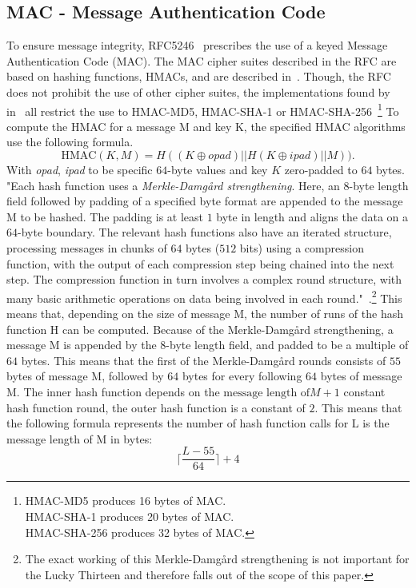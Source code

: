 \documentclass[10pt,conference,a4paper]{IEEEtran}
\begin{document}
\subsection{MAC - Message Authentication Code}
\label{sec:crypto:hmac}
To ensure message integrity, RFC5246~\cite{ietf2008transport} prescribes the use of a keyed Message Authentication Code (MAC). The MAC cipher suites described in the RFC are based on hashing functions, HMACs, and are described in~\cite{krawczyk1997rfc}. Though, the RFC does not prohibit the use of other cipher suites, the implementations found by~\citeauthor{alfardan2013lucky} in~\cite{alfardan2013lucky} all restrict the use to HMAC-MD5, HMAC-SHA-1 or HMAC-SHA-256~\footnote{HMAC-MD5 produces 16 bytes of MAC.\\HMAC-SHA-1 produces 20 bytes of MAC.\\HMAC-SHA-256 produces 32 bytes of MAC.} To compute the HMAC for a message M and key K, the specified HMAC algorithms use the following formula. 
\[ \text{HMAC}(K,M) = H((K \oplus opad)||H(K \oplus ipad)||M)). \]
With \textit{opad}, \textit{ipad} to be specific $64$-byte values and key $K$ zero-padded to $64$ bytes. "Each hash function uses a \textit{Merkle-Damg\aa rd strengthening}. Here, an 8-byte length field followed by padding of a specified byte format are appended to the message M to be hashed. The padding is at least $1$ byte in length and aligns the data on a $64$-byte boundary. The relevant hash functions also have an iterated structure, processing messages in chunks of $64$ bytes ($512$ bits) using a compression function, with the output of each compression step being chained into the next step. The compression function in turn involves a complex round structure, with many basic arithmetic operations on data being involved in each round."~\cite{alfardan2013lucky}.\footnote{The exact working of this Merkle-Damg\aa rd strengthening is not important for the Lucky Thirteen and therefore falls out of the scope of this paper.}
This means that, depending on the size of message M, the number of runs of the hash function H can be computed. Because of the Merkle-Damg\aa rd strengthening, a message M is appended by the $8$-byte length field, and padded to be a multiple of $64$ bytes. This means that the first of the Merkle-Damg\aa rd rounds consists of $55$ bytes of message M, followed by $64$ bytes for every following $64$ bytes of message M. The inner hash function depends on the $\text{message length of} M + 1$ constant hash function round, the outer hash function is a constant of $2$. This means that the following formula represents the number of hash function calls for L is the message length of M in bytes:
\[ \lceil \frac{L - 55}{64} \rceil + 4 \]
\end{document}
